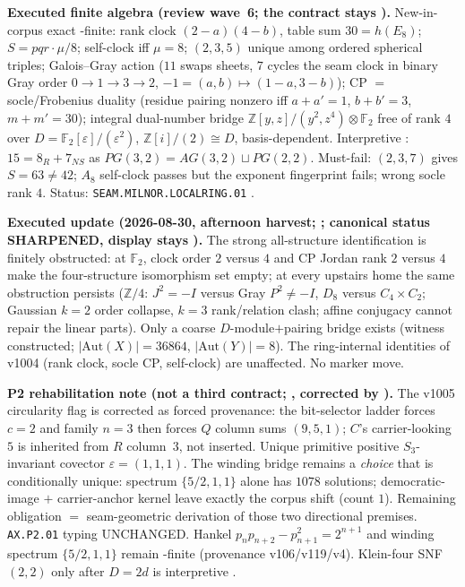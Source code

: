 \documentclass[11pt,a4paper]{article}
\begin{document}
\par\smallskip\noindent\textbf{Executed finite algebra (review wave~6; the contract stays \mO).}
New-in-corpus exact \mE-finite: rank clock $(2-a)(4-b)$, table sum $30=h(E_8)$;
$S=pqr\cdot\mu/8$; self-clock iff $\mu=8$; $(2,3,5)$ unique among ordered spherical triples;
Galois--Gray action ($11$ swaps sheets, $7$ cycles the seam clock in binary Gray order
$0\to1\to3\to2$, $-1=(a,b)\mapsto(1-a,3-b)$); CP $=$ socle/Frobenius duality (residue pairing
nonzero iff $a+a'=1$, $b+b'=3$, $m+m'=30$); integral dual-number bridge
$\mathbb Z[y,z]/(y^2,z^4)\otimes\mathbb F_2$ free of rank $4$ over
$D=\mathbb F_2[\varepsilon]/(\varepsilon^2)$, $\mathbb Z[i]/(2)\cong D$, basis-dependent.
Interpretive \mC: $15=8_R+7_{NS}$ as $PG(3,2)=AG(3,2)\sqcup PG(2,2)$.
Must-fail: $(2,3,7)$ gives $S=63\neq42$; $A_8$ self-clock passes but the exponent fingerprint
fails; wrong socle rank $4$.
Status: \texttt{SEAM.MILNOR.LOCALRING.01} \mO.

\par\smallskip\noindent\textbf{Executed update (2026-08-30, afternoon harvest;
;
canonical status SHARPENED, display stays \mO).}
The strong all-structure identification is finitely obstructed: at $\mathbb F_2$, clock
order $2$ versus $4$ and CP Jordan rank $2$ versus $4$ make the four-structure isomorphism
set empty; at every upstairs home the same obstruction persists ($\mathbb Z/4$: $J^2=-I$
versus Gray $P^2\neq-I$, $D_8$ versus $C_4\times C_2$; Gaussian $k=2$ order collapse,
$k=3$ rank/relation clash; affine conjugacy cannot repair the linear parts).
Only a coarse $D$-module$+$pairing bridge exists (witness constructed;
$\lvert\mathrm{Aut}(X)\rvert=36864$, $\lvert\mathrm{Aut}(Y)\rvert=8$).
The ring-internal identities of v1004 (rank clock, socle CP, self-clock) are
unaffected.  No marker move.

\par\smallskip\noindent\textbf{P2 rehabilitation note (not a third contract;
,
corrected by ).}
The v1005 circularity flag is corrected as forced provenance: the bit-selector ladder
forces $c=2$ and family $n=3$ then forces $Q$ column sums $(9,5,1)$; $C$'s carrier-looking
$5$ is inherited from $R$ column~$3$, not inserted.  Unique primitive positive
$S_3$-invariant covector $\varepsilon=(1,1,1)$.  The winding bridge remains a
\emph{choice} that is conditionally unique: spectrum $\{5/2,1,1\}$ alone has $1078$
solutions; democratic-image $+$ carrier-anchor kernel leave exactly the corpus shift
(count $1$).  Remaining obligation $=$ seam-geometric derivation of those two
directional premises.  \texttt{AX.P2.01} typing UNCHANGED.  Hankel
$p_n p_{n+2}-p_{n+1}^2=2^{n+1}$ and winding spectrum $\{5/2,1,1\}$ remain \mE-finite
(provenance v106/v119/v4).  Klein-four SNF $(2,2)$ only after $D=2d$ is interpretive \mC.
\end{document}
